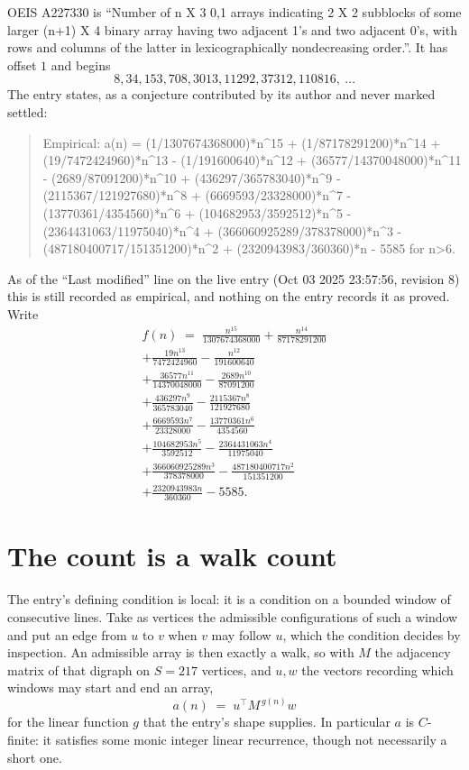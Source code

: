 \documentclass[11pt,a4paper]{article}
\theoremstyle{plain}
\theoremstyle{definition}
\begin{document}
OEIS A227330 is ``Number of n X 3 0,1 arrays indicating 2 X 2 subblocks of some larger (n+1) X 4 binary array having two adjacent 1's and two adjacent 0's, with rows and columns of the latter in lexicographically nondecreasing order.''. It has offset $1$ and begins
\[
8, 34, 153, 708, 3013, 11292, 37312, 110816,\ \dots
\]
The entry states, as a conjecture contributed by its author and never marked settled:
\begin{quote}\raggedright\small
Empirical: a(n) = (1/1307674368000)*n\^{}15 + (1/87178291200)*n\^{}14 + (19/7472424960)*n\^{}13 - (1/191600640)*n\^{}12 + (36577/14370048000)*n\^{}11 - (2689/87091200)*n\^{}10 + (436297/365783040)*n\^{}9 - (2115367/121927680)*n\^{}8 + (6669593/23328000)*n\^{}7 - (13770361/4354560)*n\^{}6 + (104682953/3592512)*n\^{}5 - (2364431063/11975040)*n\^{}4 + (366060925289/378378000)*n\^{}3 - (487180400717/151351200)*n\^{}2 + (2320943983/360360)*n - 5585 for n>6.
\end{quote}
As of the ``Last modified'' line on the live entry (Oct 03 2025 23:57:56, revision 8) this is still
recorded as empirical, and nothing on the entry records it as proved. Write
\begin{multline*}
f(n)\;=\;\frac{n^{15}}{1307674368000} + \frac{n^{14}}{87178291200} \\
+ \frac{19 n^{13}}{7472424960} - \frac{n^{12}}{191600640} \\
+ \frac{36577 n^{11}}{14370048000} - \frac{2689 n^{10}}{87091200} \\
+ \frac{436297 n^{9}}{365783040} - \frac{2115367 n^{8}}{121927680} \\
+ \frac{6669593 n^{7}}{23328000} - \frac{13770361 n^{6}}{4354560} \\
+ \frac{104682953 n^{5}}{3592512} - \frac{2364431063 n^{4}}{11975040} \\
+ \frac{366060925289 n^{3}}{378378000} - \frac{487180400717 n^{2}}{151351200} \\
+ \frac{2320943983 n}{360360} - 5585.
\end{multline*}

\section{The count is a walk count}

The entry's defining condition is local: it is a condition on a bounded window of consecutive lines. Take as vertices the
admissible configurations of such a window and put an edge from $u$ to $v$ when $v$ may
follow $u$, which the condition decides by inspection. An admissible array is then exactly a
walk, so with $M$ the adjacency matrix of that digraph on $S=217$ vertices, and $u,w$ the
vectors recording which windows may start and end an array,
\[
a(n)\;=\;u^{\!\top}M^{\,g(n)}w
\]
for the linear function $g$ that the entry's shape supplies. In particular $a$ is
$C$-finite: it satisfies some monic integer linear recurrence, though not necessarily a short
one.
\end{document}
